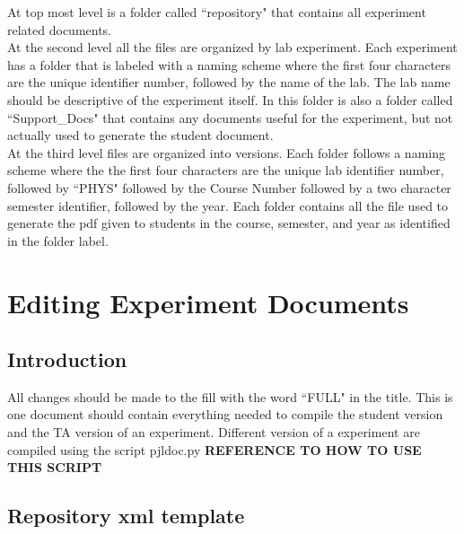 \documentclass[justified]{LabArx3_5_1}
\begin{document}
At top most level is a folder called ``repository" that contains all experiment related documents.\\

\noindent At the second level all the files are organized by lab experiment. Each experiment has a folder that is labeled with a naming scheme where the first four characters are the unique identifier number, followed by the name of the lab. The lab name should be descriptive of the experiment itself. In this folder is also a folder called ``Support\_Docs" that contains any documents useful for the experiment, but not actually used to generate the student document. \\

\noindent At the third level files are organized into versions. Each folder follows a naming scheme where the the first four characters are the unique lab identifier number, followed by ``PHYS" followed by the Course Number followed by a two character semester identifier, followed by the year. Each folder contains all the file used to generate the pdf given to students in the course, semester, and year as identified in the folder label. \\






\section{Editing Experiment Documents}\label{sec:EquipEdit}

\subsection{Introduction}

All changes should be made to the fill with the word ``FULL" in the title. This is one document should contain everything needed to compile the student version and the TA version of an experiment. Different version of a experiment are compiled using the script pjldoc.py {\bf REFERENCE TO HOW TO USE THIS SCRIPT}



\subsection{Repository xml template}
\end{document}
